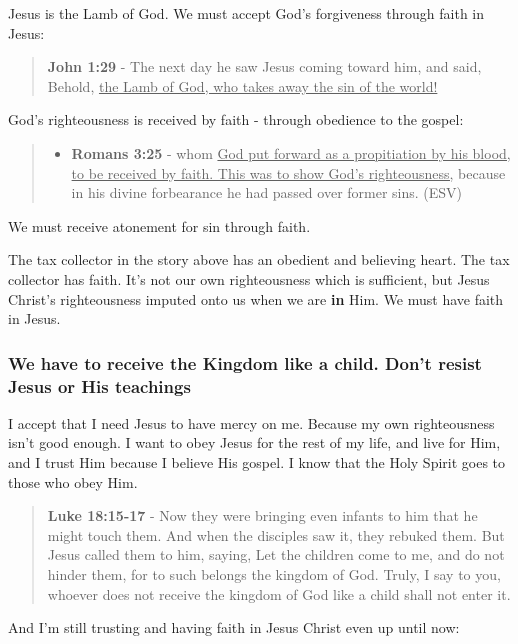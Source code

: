 \documentclass[11pt]{article}
\begin{document}
Jesus is the Lamb of God. We must accept God's forgiveness through faith in Jesus:

\begin{quote}
\textbf{John 1:29} - The next day he saw Jesus coming toward him, and said, Behold, \uline{the Lamb of God, who takes away the sin of the world!}
\end{quote}

God's righteousness is received by faith - through obedience to the gospel:

\begin{quote}
\begin{itemize}
\item \textbf{Romans 3:25} -  whom \uline{God put forward as a propitiation by his blood, to be received by faith.  This was to show God's righteousness,} because in his divine forbearance he had passed over former sins.  (ESV)
\end{itemize}
\end{quote}

We must receive atonement for sin through faith.

The tax collector in the story above has an obedient and believing heart. The tax collector has faith. It's not our own righteousness which is sufficient, but Jesus Christ's righteousness imputed onto us when we are \textbf{in} Him. We must have faith in Jesus.

\subsubsection{We have to receive the Kingdom like a child. Don't resist Jesus or His teachings}
\label{sec:org7cfa082}
I accept that I need Jesus to have mercy on me. Because my own righteousness isn't good enough. I want to obey Jesus for the rest of my life, and live for Him, and I trust Him because I believe His gospel. I know that the Holy Spirit goes to those who obey Him.

\begin{quote}
\textbf{Luke 18:15-17} - Now they were bringing even infants to him that he might touch them. And when the disciples saw it, they rebuked them. But Jesus called them to him, saying, Let the children come to me, and do not hinder them, for to such belongs the kingdom of God. Truly, I say to you, whoever does not receive the kingdom of God like a child shall not enter it.
\end{quote}

And I'm still trusting and having faith in Jesus Christ even up until now:
\end{document}
